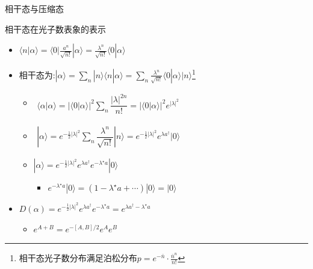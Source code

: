\documentclass{beamer}
\begin{document}
\begin{frame}{相干态与压缩态}
	\begin{block}{相干态在光子数表象的表示}
		\begin{itemize}
			\item $\langle n|\alpha\rangle=\langle 0|\frac{a^{n}}{\sqrt{n!}}|\alpha\rangle=\frac{\lambda^{n}}{\sqrt{n!}}\langle 0|\alpha\rangle$
			\item 相干态为:$|\alpha\rangle=\sum\limits_{n}|n\rangle\langle n|\alpha\rangle=\sum\limits_{n}\frac{\lambda^{n}}{\sqrt{n!}}\langle 0|\alpha\rangle|n\rangle$\footnote{\tiny{相干态光子数分布满足泊松分布$p=e^{-\bar{n}}\cdot\frac{\bar{n}^{n}}{n!}$}}
			\begin{itemize}
				\item $\begin{aligned}
					\langle \alpha|\alpha\rangle=|\langle 0|\alpha\rangle|^{2}\sum\limits_{n}\dfrac{|\lambda|^{2n}}{n!}
					=|\langle 0|\alpha\rangle|^{2}e^{|\lambda|^{2}}
				\end{aligned}$
			\item $\begin{aligned}
				|\alpha\rangle=e^{-\frac{1}{2}|\lambda|^{2}}\sum\limits_{n}\dfrac{\lambda^{n}}{\sqrt{n!}}|n\rangle=e^{-\frac{1}{2}|\lambda|^{2}}e^{\lambda a^{\dagger}}|0\rangle
			\end{aligned}$
		\item $|\alpha\rangle=e^{-\frac{1}{2}|\lambda|^{2}}e^{\lambda a^{\dagger}}e^{-\lambda^{\star}a}|0\rangle$
		\begin{itemize}
			\item $e^{-\lambda^{\star}a}|0\rangle=(1-\lambda^{\star}a+\cdots)|0\rangle=|0\rangle$
		\end{itemize}
			\end{itemize}
		\item $D(\alpha)=e^{-\frac{1}{2}|\lambda|^{2}}e^{\lambda a^{\dagger}}e^{-\lambda^{\star}a}=e^{\lambda a^{\dagger}-\lambda^{\star}a}$
		\begin{itemize}
			\item $e^{A+B}=e^{-[A,B]/2}e^{A}e^{B}$
		\end{itemize}
		\end{itemize}
	\end{block}
\end{frame}
\end{document}
